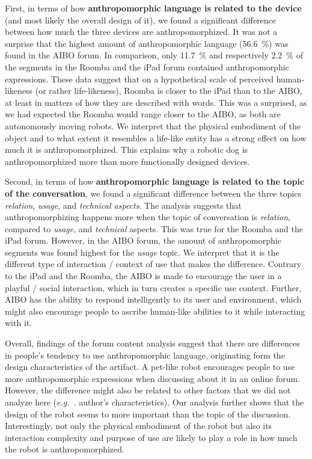 \documentclass{frontiersSCNS} %
\newcommand{\eg}{{\textit{e.g.~}}}
\begin{document}
First, in terms of how \textbf{anthropomorphic language is related to the device} (and most likely the overall design of it), we found a significant difference between how much the three devices are anthropomorphized. It was not a surprise that the highest amount of anthropomorphic
language (56.6~\%) was found in the AIBO forum. In comparison, only 11.7~\% and
respectively 2.2~\% of the segments in the Roomba and the iPad forum contained
anthropomorphic expressions. These data suggest that on a hypothetical scale of
perceived human-likeness (or rather life-likeness), Roomba is closer to the iPad
than to the AIBO, at least in matters of how they are described with words. This
was a surprised, as we had expected the Roomba would range closer to the AIBO, as both are autonomously moving robots. We interpret that the physical embodiment of the object and to what extent it resembles a life-like entity has a strong effect on how much it is anthropomorphized. This explains why a robotic dog is anthropomorphized more than more functionally designed devices.

Second, in terms of how \textbf{anthropomorphic language is related to the topic of the conversation}, we found a significant difference between the three topics \textit{relation}, \textit{usage}, and \textit{technical aspects}. The analysis suggests that anthropomorphizing happens more when the topic of conversation is \textit{relation}, compared to \textit{usage}, and \textit{technical} aspects. This was true for the Roomba and the iPad forum. However, in the AIBO forum, the amount of anthropomorphic segments was found highest for the \textit{usage} topic.  We interpret that it is the different type of interaction / context of use that makes the difference. Contrary to the iPad and the Roomba,
the AIBO is made to encourage the user in a playful / social interaction, which
in turn creates a specific use context. Further, AIBO has the ability to respond
intelligently to its user and environment, which might also encourage people to
ascribe human-like abilities to it while interacting with it.

Overall, findings of the forum content analysis suggest that there are differences in
people's tendency to use anthropomorphic language, originating form the design
characteristics of the artifact. A pet-like robot encourages people to use more 
anthropomorphic expressions when discussing about it in an online forum. However, 
the difference might also be related to other factors that we did not analyze 
here (\eg. author's characteristics). Our analysis further shows that the design 
of the robot seems to more important than the topic of the discussion. 
Interestingly, not only the physical embodiment
of the robot but also its interaction complexity and purpose of use are likely to play a role in how much the robot is anthropomorphized.
\end{document}
